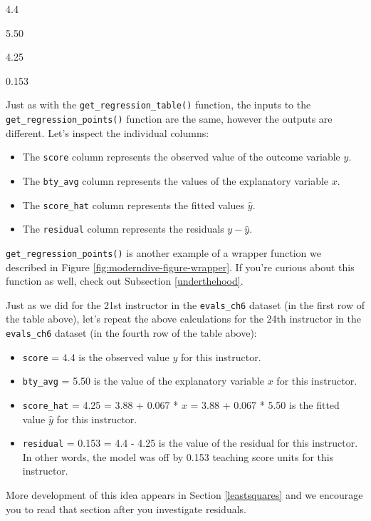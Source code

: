 \documentclass[12pt,]{krantz}
\providecommand{\tightlist}{%
  \setlength{\itemsep}{0pt}\setlength{\parskip}{0pt}}
\begin{document}
4.4

5.50

4.25

0.153

Just as with the \texttt{get\_regression\_table()} function, the inputs
to the \texttt{get\_regression\_points()} function are the same, however
the outputs are different. Let's inspect the individual columns:

\begin{itemize}
\tightlist
\item
  The \texttt{score} column represents the observed value of the outcome
  variable \(y\).
\item
  The \texttt{bty\_avg} column represents the values of the explanatory
  variable \(x\).
\item
  The \texttt{score\_hat} column represents the fitted values
  \(\widehat{y}\).
\item
  The \texttt{residual} column represents the residuals
  \(y - \widehat{y}\).
\end{itemize}

\texttt{get\_regression\_points()} is another example of a wrapper
function we described in Figure \ref{fig:moderndive-figure-wrapper}. If
you're curious about this function as well, check out Subsection
\ref{underthehood}.

Just as we did for the 21st instructor in the \texttt{evals\_ch6}
dataset (in the first row of the table above), let's repeat the above
calculations for the 24th instructor in the \texttt{evals\_ch6} dataset
(in the fourth row of the table above):

\begin{itemize}
\tightlist
\item
  \texttt{score} = 4.4 is the observed value \(y\) for this instructor.
\item
  \texttt{bty\_avg} = 5.50 is the value of the explanatory variable
  \(x\) for this instructor.
\item
  \texttt{score\_hat} = 4.25 = 3.88 + 0.067 * \(x\) = 3.88 + 0.067 *
  5.50 is the fitted value \(\widehat{y}\) for this instructor.
\item
  \texttt{residual} = 0.153 = 4.4 - 4.25 is the value of the residual
  for this instructor. In other words, the model was off by 0.153
  teaching score units for this instructor.
\end{itemize}

More development of this idea appears in Section \ref{leastsquares} and
we encourage you to read that section after you investigate residuals.
\end{document}
